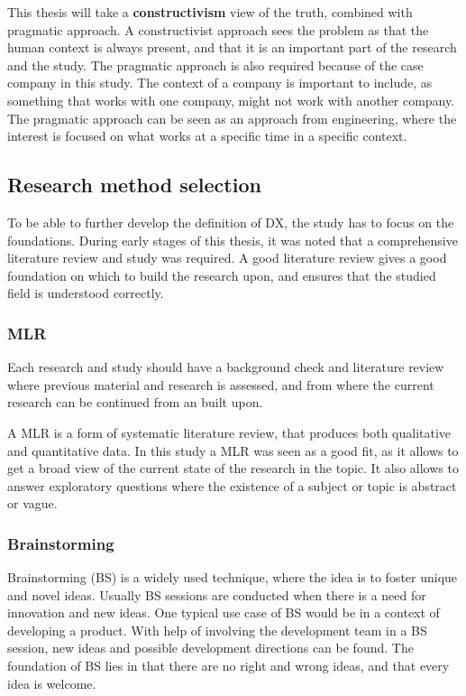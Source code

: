 \documentclass[english, 12pt, a4paper, sci, utf8, a-1b, online]{aaltothesis}
\begin{document}
This thesis will take a \textbf{constructivism} view of the truth, combined with pragmatic approach. A constructivist approach sees the problem as that the human context is always present, and that it is an important part of the research and the study. The pragmatic approach is also required because of the case company in this study. The context of a company is important to include, as something that works with one company, might not work with another company. The pragmatic approach can be seen as an approach from engineering, where the interest is focused on what works at a specific time in a specific context.

\subsection{Research method selection}

To be able to further develop the definition of DX, the study has to focus on the foundations. During early stages of this thesis, it was noted that a comprehensive literature review and study was required. A good literature review gives a good foundation on which to build the research upon, and ensures that the studied field is understood correctly.

\subsubsection{MLR}

Each research and study should have a background check and literature review where previous material and research is assessed, and from where the current research can be continued from an built upon.

A MLR is a form of systematic literature review, that produces both qualitative and quantitative data. In this study a MLR was seen as a good fit, as it allows to get a broad view of the current state of the research in the topic. It also allows to answer exploratory questions where the existence of a subject or topic is abstract or vague.

\subsubsection{Brainstorming}

Brainstorming (BS) is a widely used technique, where the idea is to foster unique and novel ideas. Usually BS sessions are conducted when there is a need for innovation and new ideas. One typical use case of BS would be in a context of developing a product. With help of involving the development team in a BS session, new ideas and possible development directions can be found. The foundation of BS lies in that there are no right and wrong ideas, and that every idea is welcome.
\end{document}
